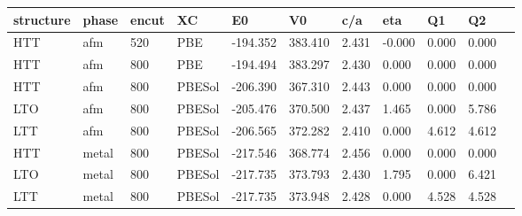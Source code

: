 \begin{tabular}{lllllllllll}
\toprule
structure &  phase & encut &      XC &       E0 &       V0 &    c/a &    eta &     Q1 &     Q2 \\
\midrule
      HTT &    afm &   520 &     PBE & -194.352 &  383.410 &  2.431 & -0.000 &  0.000 &  0.000 \\
      HTT &    afm &   800 &     PBE & -194.494 &  383.297 &  2.430 &  0.000 &  0.000 &  0.000 \\
      HTT &    afm &   800 &  PBESol & -206.390 &  367.310 &  2.443 &  0.000 &  0.000 &  0.000 \\
      LTO &    afm &   800 &  PBESol & -205.476 &  370.500 &  2.437 &  1.465 &  0.000 &  5.786 \\
      LTT &    afm &   800 &  PBESol & -206.565 &  372.282 &  2.410 &  0.000 &  4.612 &  4.612 \\
      HTT &  metal &   800 &  PBESol & -217.546 &  368.774 &  2.456 &  0.000 &  0.000 &  0.000 \\
      LTO &  metal &   800 &  PBESol & -217.735 &  373.793 &  2.430 &  1.795 &  0.000 &  6.421 \\
      LTT &  metal &   800 &  PBESol & -217.735 &  373.948 &  2.428 &  0.000 &  4.528 &  4.528 \\
\bottomrule
\end{tabular}
